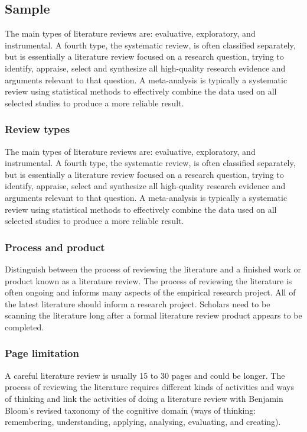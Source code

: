 \subsection{Sample}
The main types of literature reviews are: evaluative, exploratory, and instrumental. A fourth type, the systematic review, is often classified separately, but is essentially a literature review focused on a research question, trying to identify, appraise, select and synthesize all high-quality research evidence and arguments relevant to that question. A meta-analysis is typically a systematic review using statistical methods to effectively combine the data used on all selected studies to produce a more reliable result.
\subsubsection[Review types]{\textbf{Review types}}

The main types of literature reviews are: evaluative, exploratory, and instrumental. A fourth type, the systematic review, is often classified separately, but is essentially a literature review focused on a research question, trying to identify, appraise, select and synthesize all high-quality research evidence and arguments relevant to that question. A meta-analysis is typically a systematic review using statistical methods to effectively combine the data used on all selected studies to produce a more reliable result.


\subsubsection[Process and product]{\textbf{Process and product}}

Distinguish between the process of reviewing the literature and a finished work or product known as a literature review. The process of reviewing the literature is often ongoing and informs many aspects of the empirical research project. All of the latest literature should inform a research project. Scholars need to be scanning the literature long after a formal literature review product appears to be completed.

\subsubsection{\textbf{Page limitation}}

A careful literature review is usually 15 to 30 pages and could be longer. The process of reviewing the literature requires different kinds of activities and ways of thinking and link the activities of doing a literature review with Benjamin Bloom’s revised taxonomy of the cognitive domain (ways of thinking: remembering, understanding, applying, analysing, evaluating, and creating).

